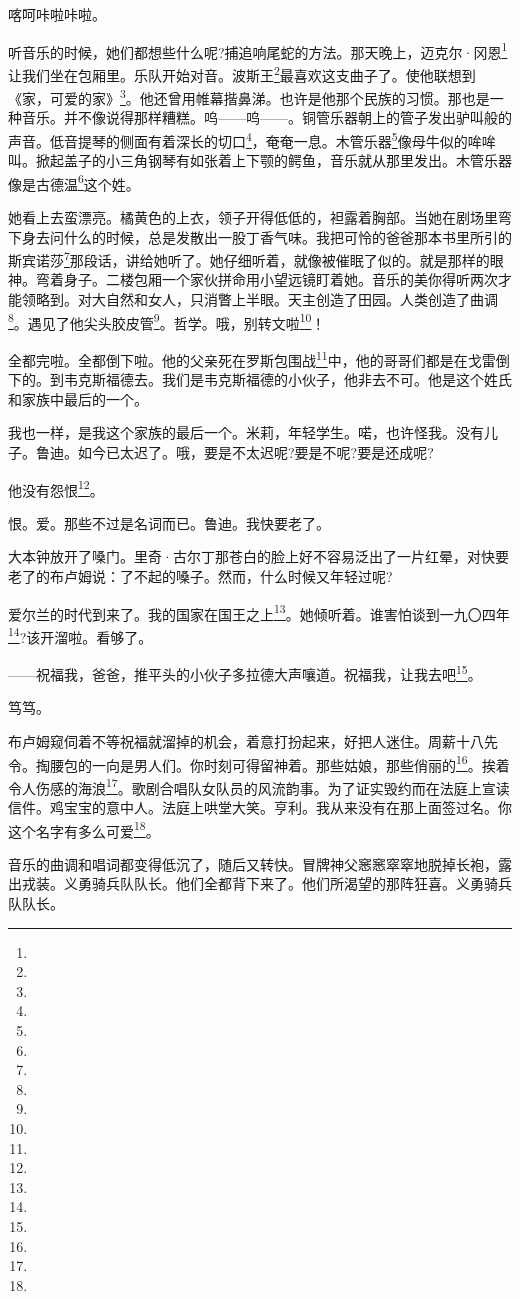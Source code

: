 \par 喀呵咔啦咔啦。
\par 听音乐的时候，她们都想些什么呢?捕追响尾蛇的方法。那天晚上，迈克尔·冈恩\footnote{}让我们坐在包厢里。乐队开始对音。波斯王\footnote{}最喜欢这支曲子了。使他联想到《家，可爱的家》\footnote{}。他还曾用帷幕揩鼻涕。也许是他那个民族的习惯。那也是一种音乐。并不像说得那样糟糕。呜——呜——。铜管乐器朝上的管子发出驴叫般的声音。低音提琴的侧面有着深长的切口\footnote{}，奄奄一息。木管乐器\footnote{}像母牛似的哞哞叫。掀起盖子的小三角钢琴有如张着上下颚的鳄鱼，音乐就从那里发出。木管乐器像是古德温\footnote{}这个姓。
\par 她看上去蛮漂亮。橘黄色的上衣，领子开得低低的，袒露着胸部。当她在剧场里弯下身去问什么的时候，总是发散出一股丁香气味。我把可怜的爸爸那本书里所引的斯宾诺莎\footnote{}那段话，讲给她听了。她仔细听着，就像被催眠了似的。就是那样的眼神。弯着身子。二楼包厢一个家伙拼命用小望远镜盯着她。音乐的美你得听两次才能领略到。对大自然和女人，只消瞥上半眼。天主创造了田园。人类创造了曲调\footnote{}。遇见了他尖头胶皮管\footnote{}。哲学。哦，别转文啦\footnote{}！
\par 全都完啦。全都倒下啦。他的父亲死在罗斯包围战\footnote{}中，他的哥哥们都是在戈雷倒下的。到韦克斯福德去。我们是韦克斯福德的小伙子，他非去不可。他是这个姓氏和家族中最后的一个。
\par 我也一样，是我这个家族的最后一个。米莉，年轻学生。喏，也许怪我。没有儿子。鲁迪。如今已太迟了。哦，要是不太迟呢?要是不呢?要是还成呢?
\par 他没有怨恨\footnote{}。
\par 恨。爱。那些不过是名词而已。鲁迪。我快要老了。
\par 大本钟放开了嗓门。里奇·古尔丁那苍白的脸上好不容易泛出了一片红晕，对快要老了的布卢姆说：了不起的嗓子。然而，什么时候又年轻过呢?
\par 爱尔兰的时代到来了。我的国家在国王之上\footnote{}。她倾听着。谁害怕谈到一九〇四年\footnote{}?该开溜啦。看够了。
\par ——祝福我，爸爸，推平头的小伙子多拉德大声嚷道。祝福我，让我去吧\footnote{}。
\par 笃笃。
\par 布卢姆窥伺着不等祝福就溜掉的机会，着意打扮起来，好把人迷住。周薪十八先令。掏腰包的一向是男人们。你时刻可得留神着。那些姑娘，那些俏丽的\footnote{}。挨着令人伤感的海浪\footnote{}。歌剧合唱队女队员的风流韵事。为了证实毁约而在法庭上宣读信件。鸡宝宝的意中人。法庭上哄堂大笑。亨利。我从来没有在那上面签过名。你这个名字有多么可爱\footnote{}。
\par 音乐的曲调和唱词都变得低沉了，随后又转快。冒牌神父窸窸窣窣地脱掉长袍，露出戎装。义勇骑兵队队长。他们全都背下来了。他们所渴望的那阵狂喜。义勇骑兵队队长。
